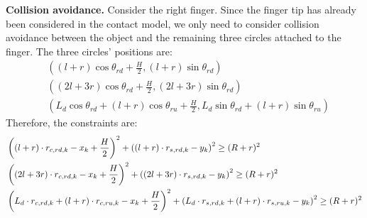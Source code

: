 \textbf{Collision avoidance.}
Consider the right finger. Since the finger tip has already been considered in the contact model, we only need to consider collision avoidance between the object and the remaining three circles attached to the finger. The three circles' positions are:
\begin{align}
    & \left( 
        (l+r) \cos\theta_{rd} + \frac{H}{2}, (l+r) \sin\theta_{rd}
     \right) \\
    & \left( 
        (2l + 3r) \cos\theta_{rd} + \frac{H}{2}, (2l + 3r) \sin\theta_{rd}
    \right) \\
    & \left( 
        L_d \cos\theta_{rd} + (l+r) \cos\theta_{ru} + \frac{H}{2}, L_d \sin\theta_{rd} + (l+r) \sin\theta_{ru}
     \right)
\end{align}
Therefore, the constraints are:
\begin{align}
    & \left( (l+r) \cdot \rc[rd,k] - \x[k]  + \frac{H}{2} \right)^2 
    + \left( (l+r) \cdot \rs[rd,k] - \y[k] \right)^2 \ge (R+r)^2 \\
    & \left( (2l+3r) \cdot \rc[rd,k] - \x[k]  + \frac{H}{2} \right)^2 
    + \left( (2l+3r) \cdot \rs[rd,k] - \y[k] \right)^2 \ge (R+r)^2 \\
    & \left( L_d \cdot \rc[rd,k] + (l+r) \cdot \rc[ru,k] - \x[k]
    + \frac{H}{2} \right)^2 
    + \left( L_d \cdot \rs[rd,k] + (l+r) \cdot \rs[ru,k] - \y[k] \right)^2 \ge (R+r)^2
\end{align}


